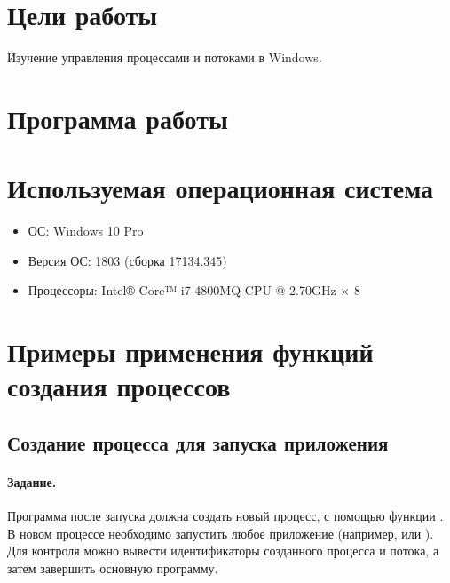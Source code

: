 





\tableofcontents
\newpage

\section{Цели работы}

Изучение управления процессами и потоками в Windows.

\section{Программа работы}



\section{Используемая операционная система}

\begin{itemize}
	\item ОС: Windows 10 Pro
	\item Версия ОС: 1803 (сборка 17134.345)
	\item Процессоры: Intel® Core™ i7-4800MQ CPU @ 2.70GHz × 8
\end{itemize}

\newpage

\section{Примеры применения функций создания процессов}

\subsection{Создание процесса для запуска приложения}

\paragraph{Задание.} Программа после запуска должна создать новый процесс, с помощью функции . В новом процессе необходимо запустить любое приложение (например,  или ). Для контроля можно вывести идентификаторы созданного процесса и потока, а затем завершить основную программу.


